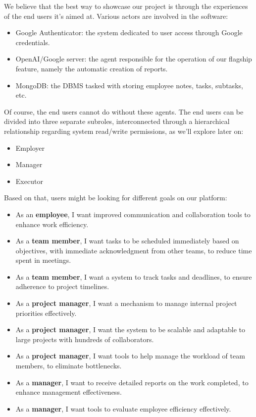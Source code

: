 \documentclass{article}
\begin{document}
We believe that the best way to showcase our project is through the experiences of the end users it's aimed at. Various actors are involved in the software:
\begin{itemize}
  \item Google Authenticator: the system dedicated to user access through Google credentials.
  \item OpenAI/Google server: the agent responsible for the operation of our flagship feature, namely the automatic creation of reports.
  \item MongoDB: the DBMS tasked with storing employee notes, tasks, subtasks, etc.
\end{itemize}
Of course, the end users cannot do without these agents. The end users can be divided into three separate subroles, interconnected through a hierarchical relationship regarding system read/write permissions, as we'll explore later on:
\begin{itemize}
  \item Employer
  \item Manager
  \item Executor
\end{itemize}

Based on that, users might be looking for different goals on our platform:
\begin{itemize}
    \item As an \textbf{employee}, I want improved communication and collaboration tools to enhance work efficiency.
    \item As a \textbf{team member}, I want tasks to be scheduled immediately based on objectives, with immediate acknowledgment from other teams, to reduce time spent in meetings.
    \item As a \textbf{team member}, I want a system to track tasks and deadlines, to ensure adherence to project timelines.
    \item As a \textbf{project manager}, I want a mechanism to manage internal project priorities effectively.
    \item As a \textbf{project manager}, I want the system to be scalable and adaptable to large projects with hundreds of collaborators.
    \item As a \textbf{project manager}, I want tools to help manage the workload of team members, to eliminate bottlenecks.
    \item As a \textbf{manager}, I want to receive detailed reports on the work completed, to enhance management effectiveness.
    \item As a \textbf{manager}, I want tools to evaluate employee efficiency effectively.
\end{itemize}
\end{document}
